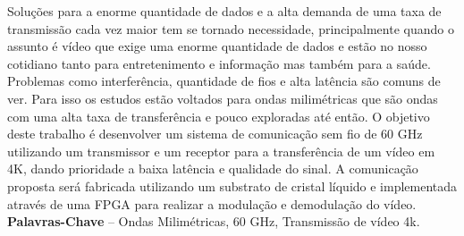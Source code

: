 \documentclass[pnumromarab, abnttoc, capsec, times]{politex}
\begin{document}
%

\capa
\falsafolhaderosto
\folhaderosto








%
%




\begin{resumo}
Soluções para a enorme quantidade de dados e a alta demanda de uma taxa de transmissão cada vez maior tem se tornado necessidade, principalmente quando o assunto é vídeo que exige uma enorme quantidade de dados e estão no nosso cotidiano tanto para entretenimento e informação mas também para a saúde. Problemas como interferência, quantidade de fios e alta latência são comuns de ver. Para isso os estudos estão voltados para ondas milimétricas que são ondas com uma alta taxa de transferência e pouco exploradas até então. O objetivo deste trabalho é desenvolver um sistema de comunicação sem fio de 60 GHz utilizando um transmissor e um receptor para a transferência de um vídeo em 4K, dando prioridade a baixa latência e qualidade do sinal. A comunicação proposta será fabricada utilizando um substrato de cristal líquido e implementada através de uma FPGA para realizar a modulação e demodulação do vídeo.
%
\\[3\baselineskip]
%
\textbf{Palavras-Chave} -- Ondas Milimétricas, 60 GHz, Transmissão de vídeo 4k.
\end{resumo}
\end{document}
